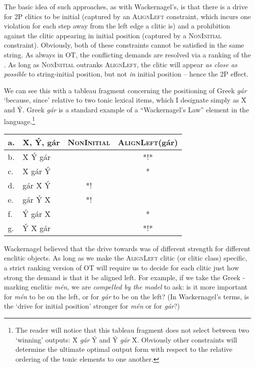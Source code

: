 \documentclass[output=paper,
modfonts
]{LSP/langsci}
\begin{document}
The basic idea of such approaches, as with Wackernagel's, is that there is
a drive for 2P clitics to be initial (captured by an \textsc{AlignLeft} constraint, which
incurs one violation for each step away from the left edge a clitic is) and a prohibition
against the clitic appearing in initial position (captured by a \textsc{NonInitial} constraint).
Obviously, both of these constraints cannot be satisfied in the same string. As always
in OT, the conflicting demands are resolved via a ranking of the . As long as
\textsc{NonInitial} outranks \textsc{AlignLeft}, the clitic will appear \textit{as close
as possible} to string-initial position, but not \textit{in} initial position -- hence
the 2P effect.

We can see this with a tableau fragment concerning the positioning of Greek \textit{gár} `because,
since' relative to two tonic lexical items, which I designate simply as \'{X} and \'{Y}. Greek
\textit{gár} is a standard example of a ``Wackernagel's Law'' element in the language.\footnote{The
reader will notice that this tableau fragment does not select between two `winning' outputs:
\'{X} \textit{gár} \'{Y} and \'{Y} \textit{gár} \'{X}. Obviously other constraints will determine
the ultimate optimal output form with respect to the relative ordering of the tonic elements to
one another.}

\begin{exe}
\ex\begin{tabular}[t]{|ll||c|c|}
\firsthline
a. & \'{X}, \'{Y}, gár & \textsc{NonInitial} & \textsc{AlignLeft}(gár) \\ \hline\hline
b. & \'{X} \'{Y} gár &  & \cellcolor{lightgray}*!* \\\hline
c. & \'{X} gár \'{Y} &  & * \\\hline
d. & gár \'{X} \'{Y} & \cellcolor{lightgray}*! & \cellcolor{lightgray} \\\hline
e. & gár \'{Y} \'{X} & \cellcolor{lightgray}*! & \cellcolor{lightgray} \\\hline
f. & \'{Y} gár \'{X} &  & * \\\hline
g. & \'{Y} \'{X} gár &  & \cellcolor{lightgray}*!* \\\hline
\end{tabular}
\end{exe}

Wackernagel believed that the drive towards  was of different
strength for different enclitic objects. As long as we make the \textsc{AlignLeft} 
clitic (or clitic class) specific, a strict ranking version of OT will require us to decide
for each clitic just how strong the demand is that it be aligned left. For example, if we
take the Greek -marking enclitic \textit{mén,} we are \textit{compelled by the model} to ask: is it more
important for \textit{mén} to be on the left, or for \textit{gár} to be on the left? (In Wackernagel's terms,
is the `drive for initial position' stronger for \textit{mén} or for \textit{gár}?)
\end{document}
